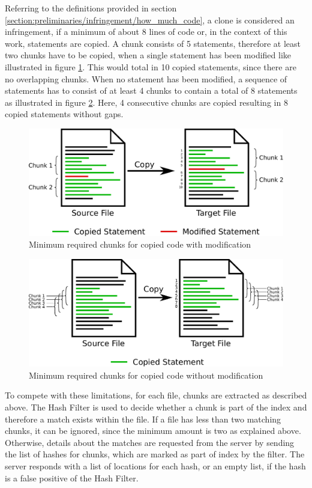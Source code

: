 Referring to the definitions provided in section \ref{section:preliminaries/infringement/how_much_code}, a clone is considered an infringement, if a minimum of about 8 lines of code or, in the context of this work, statements are copied.
A chunk consists of 5 statements, therefore at least two chunks have to be copied, when a single statement has been modified like illustrated in figure \ref{fig:required_chunks_modified}.
This would total in 10 copied statements, since there are no overlapping chunks.
When no statement has been modified, a sequence of statements has to consist of at least 4 chunks to contain a total of 8 statements as illustrated in figure \ref{fig:required_chunks}.
Here, 4 consecutive chunks are copied resulting in 8 copied statements without gaps.

\begin{figure}[h]
	\centering
	\includegraphics[width=0.9\linewidth]{figures/required_chunks_modified.pdf}
	\caption{Minimum required chunks for copied code with modification}\label{fig:required_chunks_modified}
\end{figure}

\begin{figure}[h]
	\centering
	\includegraphics[width=0.9\linewidth]{figures/required_chunks.pdf}
	\caption{Minimum required chunks for copied code without modification}\label{fig:required_chunks}
\end{figure}

To compete with these limitations, for each file, chunks are extracted as described above.
The Hash Filter is used to decide whether a chunk is part of the index and therefore a match exists within the file.
If a file has less than two matching chunks, it can be ignored, since the minimum amount is two as explained above.
Otherwise, details about the matches are requested from the server by sending the list of hashes for chunks, which are marked as part of index by the filter.
The server responds with a list of locations for each hash, or an empty list, if the hash is a false positive of the Hash Filter.

